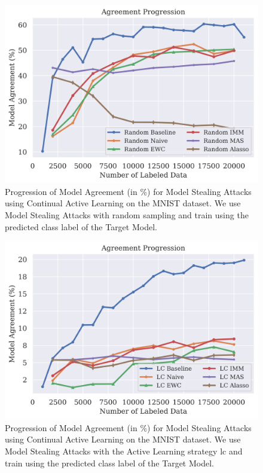 \begin{figure}[h]
    \centering
    \includegraphics[width=0.7\linewidth]{images/results_CALMS/cifar_label_random.png}
    \caption[Agreement Comparison for Model Stealing on CIFAR10 using the predicted class label and the Active Learning strategy Random]{Progression of Model Agreement
    (in \%) for Model Stealing Attacks using Continual Active Learning on the MNIST dataset. We use Model Stealing Attacks with random sampling
    and train using the predicted class label of the Target Model.}
    \label{fig:CALMSCIFAR10LabelRandom}
\end{figure}

\begin{figure}[h]
    \centering
    \includegraphics[width=0.7\linewidth]{images/results_CALMS/cifar100_label_lc.png}
    \caption[Agreement Comparison for Model Stealing on CIFAR10 using the predicted class label and the Active Learning strategy LC]{Progression of Model Agreement
    (in \%) for Model Stealing Attacks using Continual Active Learning on the MNIST dataset. We use Model Stealing Attacks with the Active Learning strategy
    \gls{lc} and train using the predicted class label of the Target Model.}
    \label{fig:CALMSCIFAR10LabelLC}
\end{figure}

